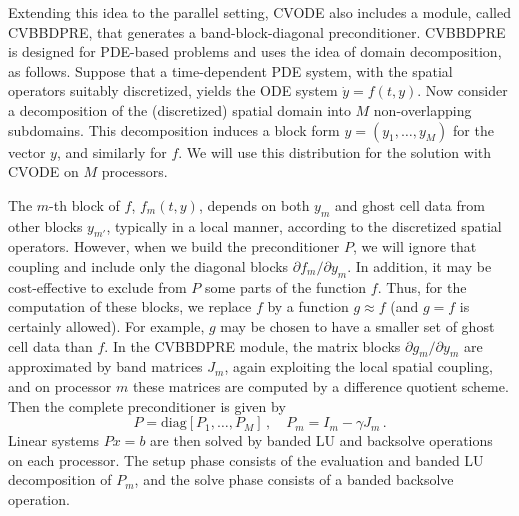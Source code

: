 Extending this idea to the parallel setting, CVODE also includes a
module, called CVBBDPRE, that generates a band-block-diagonal
preconditioner.  CVBBDPRE is designed for PDE-based problems and uses the
idea of domain decomposition, as follows.  Suppose that a
time-dependent PDE system, with the spatial operators suitably
discretized, yields the ODE system $\dot{y} = f(t,y)$.  Now consider a
decomposition of the (discretized) spatial domain into $M$
non-overlapping subdomains.  This decomposition induces a block form
$y = (y_1,\ldots,y_M)$ for the vector $y$, and similarly for $f$.  We
will use this distribution for the solution with CVODE on $M$
processors.

The $m$-th block of $f$, $f_m(t,y)$, depends on both $y_m$ and ghost
cell data from other blocks $y_{m'}$, typically in a local manner,
according to the discretized spatial operators.  However, when we
build the preconditioner $P$, we will ignore that coupling and
include only the diagonal blocks $\partial f_m / \partial y_m$.  In
addition, it may be cost-effective to exclude from $P$ some parts of
the function $f$.  Thus, for the computation of these blocks, we
replace $f$ by a function $g \approx f$ (and $g = f$ is certainly
allowed).  For example, $g$ may be chosen to have a smaller set of ghost
cell data than $f$.  In the CVBBDPRE module, the matrix blocks
$\partial g_m/\partial y_m$ are approximated by band matrices $J_m$,
again exploiting the local spatial coupling, and on processor $m$
these matrices
are computed by a difference quotient scheme.  Then the complete
preconditioner is given by
\begin{equation*}
  P = \mbox{diag}[P_1,\ldots,P_M] \, , \quad 
  P_m = I_m - \gamma J_m \, . 
\end{equation*}
Linear systems $Px = b$ are then solved by banded LU and backsolve
operations on each processor.  The setup phase consists of the
evaluation and banded LU decomposition of $P_m$, and the solve phase
consists of a banded backsolve operation.

